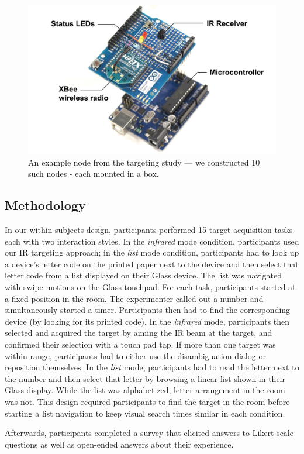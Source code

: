 \documentclass{sigchi}
\begin{document}
\begin{figure}[b]
\centering
\includegraphics[width=0.8\columnwidth]{figures/study-node.pdf}
\caption{An example node from the targeting study --- we constructed 10 such nodes - each mounted in a box.}
\label{fig:target}
\end{figure}

\subsection{Methodology}
In our within-subjects design, participants performed 15 target acquisition tasks each with two interaction styles. In the {\em infrared} mode condition, participants used our IR targeting approach; in the {\em list} mode condition, participants had to look up a device's letter code on the printed paper next to the device and then select that letter code from a list displayed on their Glass device. The list was navigated with swipe motions on the Glass touchpad. For each task, participants started at a fixed position in the room. The experimenter called out a number and simultaneously started a timer. Participants then had to find the corresponding device (by looking for its printed code). In the {\em infrared} mode, participants then selected and acquired the target by aiming the IR beam at the target, and confirmed their selection with a touch pad tap. If more than one target was within range, participants had to either use the disambiguation dialog or reposition themselves. In the {\em list} mode, participants had to read the letter next to the number and then select that letter by browsing a linear list shown in their Glass display. While the list was alphabetized, letter arrangement in the room was not. This design required participants to find the target in the room before starting a list navigation to keep visual search times similar in each condition.

Afterwards, participants completed a survey that elicited answers to Likert-scale questions as well as open-ended answers about their experience.
\end{document}
